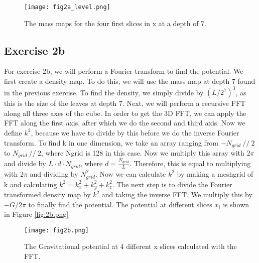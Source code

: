 \begin{figure}[h!]
  \centering
  \texttt{[image: fig2a\_level.png]}
  \caption{The mass maps for the four first slices in x at a depth of 7.}
  \label{fig:2a3}
\end{figure}

\subsection{Exercise 2b}

For exercise 2b, we will perform a Fourier transform to find the potential. We first create a density map. To do this, we will use the mass map at depth 7 found in the previous exercise. To find the density, we simply divide by $(L/2^7)^3$, as this is the size of the leaves at depth 7. Next, we will perform a recursive FFT along all three axes of the cube. In order to get the 3D FFT, we can apply the FFT along the first axis, after which we do the second and third axis. Now we define $k^2$, because we have to divide by this before we do the inverse Fourier transform. To find k in one dimension, we take an array ranging from $-N_{grid}\ //\ 2 $ to $N_{grid}\ // \ 2$, where Ngrid is 128 in this case. Now we multiply this array with $2\pi$ and divide by $L \cdot d \cdot N_{grid}$, where $d = \frac{N_{grid}}{L}$. Therefore, this is equal to multiplying with $2\pi$ and dividing by $N_{grid}^2$. Now we can calculate $k^2$ by making a meshgrid of k and calculating $k^2 = k_x^2 + k_y^2 + k_z^2$. The next step is to divide the Fourier transformed density map by $k^2$ and taking the inverse FFT. We multiply this by $-G/2\pi$ to finally find the potential. The potential at different slices $x_i$ is shown in Figure \ref{fig:2b.png} 

\begin{figure}[h!]
  \centering
  \texttt{[image: fig2b.png]}
  \caption{The Gravitational potential at 4 different x slices calculated with the FFT.}
  \label{fig:2b}
\end{figure}
